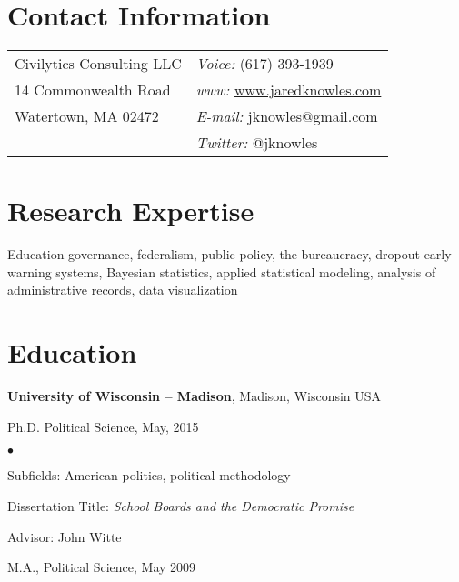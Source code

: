 \documentclass[margin,line]{res}
\newenvironment{list1}{
  \begin{list}{\ding{113}}{%
      \setlength{\itemsep}{0in}
      \setlength{\parsep}{0in} \setlength{\parskip}{0in}
      \setlength{\topsep}{0in} \setlength{\partopsep}{0in} 
      \setlength{\leftmargin}{0.17in}}}{\end{list}}
\newenvironment{list2}{
  \begin{list}{$\bullet$}{%
      \setlength{\itemsep}{0in}
      \setlength{\parsep}{0in} \setlength{\parskip}{0in}
      \setlength{\topsep}{0in} \setlength{\partopsep}{0in} 
      \setlength{\leftmargin}{0.2in}}}{\end{list}}
\begin{document}

\begin{resume}
\section{\sc Contact Information}
\vspace{.05in}
\begin{tabular}{@{}p{2.75in}p{2.75in}}
Civilytics Consulting LLC & {\it Voice:}  (617) 393-1939 \\            
14 Commonwealth Road & {\it www:} \url{www.jaredknowles.com} \\           
Watertown, MA 02472 & {\it E-mail:}  jknowles@gmail.com\\       
 & {\it Twitter:} @jknowles      \\   
\end{tabular}


\section{\sc Research Expertise}
Education governance, federalism, public policy, the bureaucracy, dropout early warning systems, Bayesian statistics, applied statistical modeling, analysis of administrative records, data visualization

\section{\sc Education}
{\bf University of Wisconsin -- Madison}, Madison, Wisconsin USA\\
\vspace*{-.1in}
\begin{list1}
\item[] Ph.D. Political Science, May, 2015
\begin{list2}
\vspace*{.05in}
\item Subfields: American politics, political methodology
\item Dissertation Title: \emph {School Boards and the Democratic Promise} 
\item Advisor:  John Witte
\end{list2}
\vspace*{.05in}
\item[] M.A., Political Science,  May 2009
\end{list1}


\end{resume}
\end{document}
